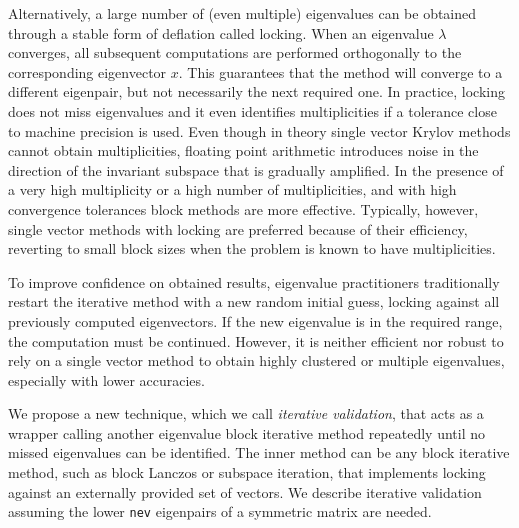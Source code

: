 \documentclass{report}
\begin{document}
Alternatively, a large number of (even multiple) eigenvalues can be
obtained through a stable form of deflation called locking.
When an eigenvalue $\lambda$ converges, all subsequent
computations are performed orthogonally to the corresponding
eigenvector $x$.
This guarantees that the method will converge to a different eigenpair,
but not necessarily the next required one.
In practice, locking does not miss eigenvalues and it even identifies
multiplicities if a tolerance close to machine precision is used.
Even though in theory single vector Krylov methods cannot obtain
multiplicities, floating point arithmetic introduces noise in the direction
of the invariant subspace that is gradually amplified.
In the presence of a very high multiplicity or a high number of multiplicities,
and with high convergence tolerances
block methods are more effective.
Typically, however, single vector methods with locking are preferred
because of their efficiency, reverting to small block sizes when the
problem is known to have multiplicities.

To improve confidence on obtained results, eigenvalue practitioners
traditionally restart the iterative method with a new random initial guess,
locking against all previously computed eigenvectors.
If the new eigenvalue is in the required range, the computation
must be continued.
However, it is neither efficient nor robust to rely on a single
vector method to obtain highly clustered or multiple eigenvalues, especially
with lower accuracies.

We propose a new technique, which we call {\it iterative validation},
that acts as a wrapper calling another eigenvalue block iterative method
repeatedly until no missed eigenvalues can be identified.
The inner method can be any block iterative method, such as
block Lanczos or subspace iteration, that implements locking against
an externally provided set of vectors.
We describe iterative validation assuming the lower {\tt nev}
eigenpairs of a symmetric matrix are needed.
\end{document}
